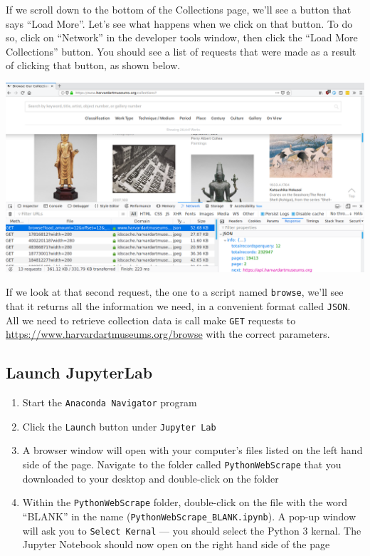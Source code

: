 \documentclass[
]{book}
\providecommand{\tightlist}{%
  \setlength{\itemsep}{0pt}\setlength{\parskip}{0pt}}
\begin{document}
If we scroll down to the bottom of the Collections page, we'll see a
button that says ``Load More''. Let's see what happens when we click on
that button. To do so, click on ``Network'' in the developer tools
window, then click the ``Load More Collections'' button. You should see
a list of requests that were made as a result of clicking that button,
as shown below.

\includegraphics{Python/PythonWebScrape/images/dev_tools_network.png}

If we look at that second request, the one to a script named
\texttt{browse}, we'll see that it returns all the information we need, in
a convenient format called \texttt{JSON}. All we need to retrieve collection
data is call make \texttt{GET} requests to
\url{https://www.harvardartmuseums.org/browse} with the correct
parameters.

\hypertarget{launch-jupyterlab-2}{%
\subsection{Launch JupyterLab}\label{launch-jupyterlab-2}}

\begin{enumerate}
\def\labelenumi{\arabic{enumi}.}
\tightlist
\item
  Start the \texttt{Anaconda\ Navigator} program
\item
  Click the \texttt{Launch} button under \texttt{Jupyter\ Lab}
\item
  A browser window will open with your computer's files listed on the left hand side of the page. Navigate to the folder called \texttt{PythonWebScrape} that you downloaded to your desktop and double-click on the folder
\item
  Within the \texttt{PythonWebScrape} folder, double-click on the file with the word ``BLANK'' in the name (\texttt{PythonWebScrape\_BLANK.ipynb}). A pop-up window will ask you to \texttt{Select\ Kernal} --- you should select the Python 3 kernal. The Jupyter Notebook should now open on the right hand side of the page
\end{enumerate}
\end{document}
